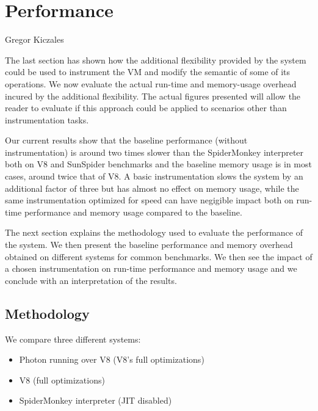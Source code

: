 \chapter{Performance}
{Gregor Kiczales~\cite{Kiczales92towardsa}}

\label{chap:Performance}

The last section has shown how the additional flexibility provided by the
system could be used to instrument the VM and modify the semantic of some of
its operations. We now evaluate the actual run-time and memory-usage overhead
incured by the additional flexibility. The actual figures presented will allow
the reader to evaluate if this approach could be applied to scenarios other
than instrumentation tasks.

Our current results show that the baseline performance (without
instrumentation) is around two times slower than the SpiderMonkey interpreter
both on V8 and SunSpider benchmarks and the baseline memory usage is in most
cases, around twice that of V8. A basic instrumentation slows the system by an
additional factor of three but has almost no effect on memory usage, while the
same instrumentation optimized for speed can have negigible impact both on
run-time performance and memory usage compared to the baseline.

The next section explains the methodology used to evaluate the performance of
the system. We then present the baseline performance and memory overhead
obtained on different systems for common benchmarks. We then see the impact of
a chosen instrumentation on run-time performance and memory usage and we
conclude with an interpretation of the results. 

\section{Methodology}

We compare three different systems:
\begin{itemize}
    \item Photon running over V8 (V8's full optimizations)
    \item V8 (full optimizations)
    \item SpiderMonkey interpreter (JIT disabled)
\end{itemize}

